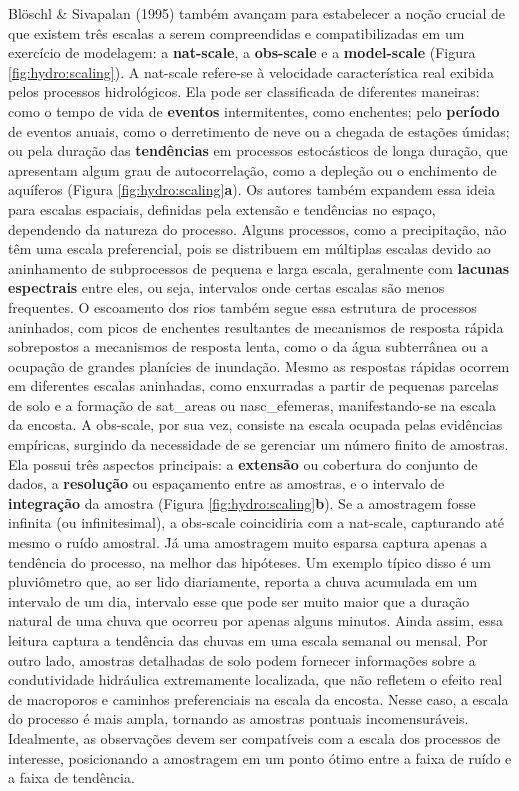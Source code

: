 \documentclass[./main.tex]{subfiles}
\begin{document}
\par Blöschl \& Sivapalan (1995) também avançam para estabelecer a noção crucial de que existem três escalas a serem compreendidas e compatibilizadas em um exercício de modelagem: a \textbf{\gls{nat-scale}}, a \textbf{\gls{obs-scale}} e a \textbf{\gls{model-scale}} (Figura \ref{fig:hydro:scaling}). A \gls{nat-scale} refere-se à velocidade característica real exibida pelos processos hidrológicos. Ela pode ser classificada de diferentes maneiras: como o tempo de vida de \textbf{eventos} intermitentes, como enchentes; pelo \textbf{período} de eventos anuais, como o derretimento de neve ou a chegada de estações úmidas; ou pela duração das \textbf{tendências} em processos estocásticos de longa duração, que apresentam algum grau de autocorrelação, como a depleção ou o enchimento de aquíferos (Figura \ref{fig:hydro:scaling}\textbf{a}). Os autores também expandem essa ideia para escalas espaciais, definidas pela extensão e tendências no espaço, dependendo da natureza do processo. Alguns processos, como a precipitação, não têm uma escala preferencial, pois se distribuem em múltiplas escalas devido ao aninhamento de subprocessos de pequena e larga escala, geralmente com \textbf{lacunas espectrais} entre eles, ou seja, intervalos onde certas escalas são menos frequentes. O escoamento dos rios também segue essa estrutura de processos aninhados, com picos de enchentes resultantes de mecanismos de resposta rápida sobrepostos a mecanismos de resposta lenta, como o da água subterrânea ou a ocupação de grandes planícies de inundação. Mesmo as respostas rápidas ocorrem em diferentes escalas aninhadas, como enxurradas a partir de pequenas parcelas de solo e a formação de \gls{sat_areas} ou \gls{nasc_efemeras}, manifestando-se na escala da encosta. A \gls{obs-scale}, por sua vez, consiste na escala ocupada pelas evidências empíricas, surgindo da necessidade de se gerenciar um número finito de amostras. Ela possui três aspectos principais: a \textbf{extensão} ou cobertura do conjunto de dados, a \textbf{resolução} ou espaçamento entre as amostras, e o intervalo de \textbf{integração} da amostra (Figura \ref{fig:hydro:scaling}\textbf{b}). Se a amostragem fosse infinita (ou infinitesimal), a \gls{obs-scale} coincidiria com a \gls{nat-scale}, capturando até mesmo o ruído amostral. Já uma amostragem muito esparsa captura apenas a tendência do processo, na melhor das hipóteses. Um exemplo típico disso é um pluviômetro que, ao ser lido diariamente, reporta a chuva acumulada em um intervalo de um dia, intervalo esse que pode ser muito maior que a duração natural de uma chuva que ocorreu por apenas alguns minutos. Ainda assim, essa leitura captura a tendência das chuvas em uma escala semanal ou mensal. Por outro lado, amostras detalhadas de solo podem fornecer informações sobre a condutividade hidráulica extremamente localizada, que não refletem o efeito real de macroporos e caminhos preferenciais na escala da encosta. Nesse caso, a escala do processo é mais ampla, tornando as amostras pontuais incomensuráveis. Idealmente, as observações devem ser compatíveis com a escala dos processos de interesse, posicionando a amostragem em um ponto ótimo entre a faixa de ruído e a faixa de tendência. 
\end{document}
